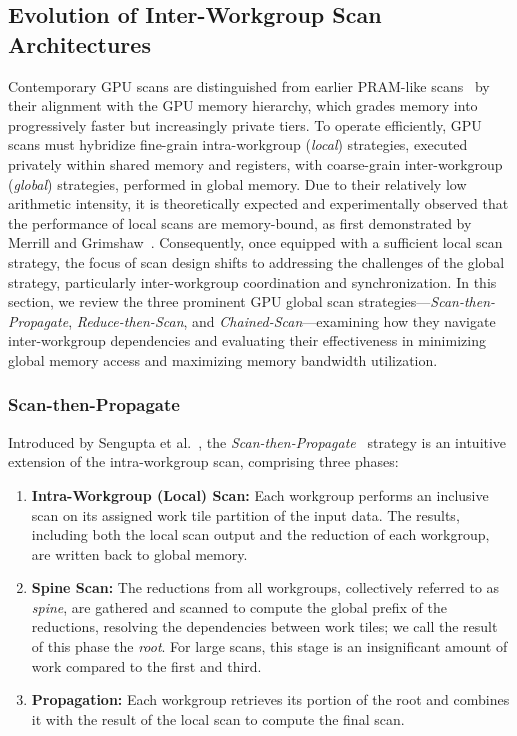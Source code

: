 \documentclass[sigconf]{acmart}
\begin{document}
\subsection{Evolution of Inter-Workgroup Scan Architectures}
Contemporary GPU scans are distinguished from earlier PRAM-like scans~\cite{} by their alignment with the GPU memory hierarchy, which grades memory into progressively faster but increasingly private tiers. To operate efficiently, GPU scans must hybridize fine-grain intra-workgroup (\emph{local}) strategies, executed privately within shared memory and registers, with coarse-grain inter-workgroup (\emph{global}) strategies, performed in global memory. Due to their relatively low arithmetic intensity, it is theoretically expected and experimentally observed that the performance of local scans are memory-bound, as first demonstrated by Merrill and Grimshaw~\cite{}. Consequently, once equipped with a sufficient local scan strategy, the focus of scan design shifts to addressing the challenges of the global strategy, particularly inter-workgroup coordination and synchronization. In this section, we review the three prominent GPU global scan strategies---\emph{Scan-then-Propagate}, \emph{Reduce-then-Scan}, and \emph{Chained-Scan}---examining how they navigate inter-workgroup dependencies and evaluating their effectiveness in minimizing global memory access and maximizing memory bandwidth utilization.

\subsubsection{Scan-then-Propagate}
Introduced by Sengupta et al.~\cite{10.5555/1280094.1280110}, the \emph{Scan-then-Propagate}~\cite{GPUGems3, Sengupta2011} strategy is an intuitive extension of the intra-workgroup scan, comprising three phases:
\begin{enumerate}
  \item \textbf{Intra-Workgroup (Local) Scan:} Each workgroup performs an inclusive scan on its assigned work tile partition of the input data. The results, including both the local scan output and the reduction of each workgroup, are written back to global memory.
  \item \textbf{Spine Scan:} The reductions from all workgroups, collectively referred to as \emph{spine}, are gathered and scanned to compute the global prefix of the reductions, resolving the dependencies between work tiles; we call the result of this phase the \emph{root}. For large scans, this stage is an insignificant amount of work compared to the first and third.
  \item \textbf{Propagation:} Each workgroup retrieves its portion of the root and combines it with the result of the local scan to compute the final scan.
\end{enumerate}
\end{document}
